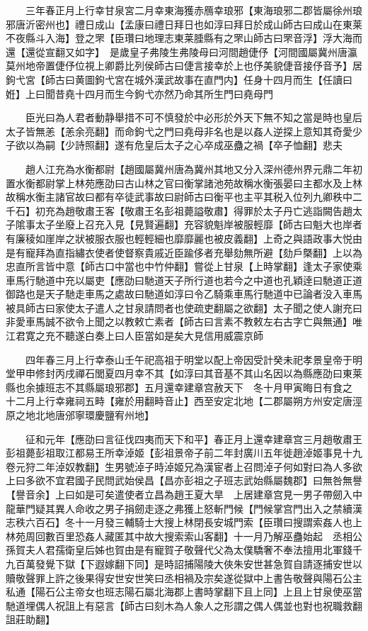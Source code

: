 　　三年春正月上行幸甘泉宮二月幸東海獲赤鴈幸琅邪【東海琅邪二郡皆屬徐州琅邪唐沂密州也】禮日成山【孟康曰禮日拜日也如淳曰拜日於成山師古曰成山在東莱不夜縣斗入海】登之罘【臣瓚曰地理志東莱腄縣有之罘山師古曰罘音浮】浮大海而還【還從宣翻又如字】　是歲皇子弗陵生弗陵母曰河間趙倢伃【河間國屬冀州唐瀛莫州地帝置倢伃位視上卿爵比列侯師古曰倢言接幸於上也伃美貌倢音接伃音予】居鉤弋宮【師古曰黄圖鉤弋宮在城外漢武故事在直門内】任身十四月而生【任讀曰姙】上曰聞昔堯十四月而生今鉤弋亦然乃命其所生門曰堯母門

　　臣光曰為人君者動静舉措不可不慎發於中必形於外天下無不知之當是時也皇后太子皆無恙【恙余亮翻】而命鉤弋之門曰堯母非名也是以姦人逆探上意知其奇愛少子欲以為嗣【少詩照翻】遂有危皇后太子之心卒成巫蠱之禍【卒子恤翻】悲夫

　　趙人江充為水衡都尉【趙國屬冀州唐為冀州其地又分入深州德州界元鼎二年初置水衡都尉掌上林苑應劭曰古山林之官曰衡掌諸池苑故稱水衡張晏曰主都水及上林故稱水衡主諸官故曰都有卒徒武事故曰尉師古曰衡平也主平其税入位列九卿秩中二千石】初充為趙敬肅王客【敬肅王名彭祖薨謚敬肅】得罪於太子丹亡逃詣闕告趙太子隂事太子坐廢上召充入見【見賢遍翻】充容貌魁岸被服輕靡【師古曰魁大也岸者有廉稜如崖岸之狀被服衣服也輕輕細也靡靡麗也被皮義翻】上奇之與語政事大悦由是有寵拜為直指繡衣使者使督察貴戚近臣踰侈者充舉劾無所避【劾戶槩翻】上以為忠直所言皆中意【師古口中當也中竹仲翻】嘗從上甘泉【上時掌翻】逢太子家使乘車馬行馳道中充以屬吏【應劭曰馳道天子所行道也若今之中道也孔穎逹曰馳道正道御路也是天子馳走車馬之處故曰馳道如淳曰令乙騎乘車馬行馳道中已論者没入車馬被具師古曰家使太子遣人之甘泉請問者也使疏吏翻屬之欲翻】太子聞之使人謝充曰非愛車馬誠不欲令上聞之以教敕亡素者【師古曰言素不教敕左右古字亡與無通】唯江君寛之充不聽遂白奏上曰人臣當如是矣大見信用威震京師

　　四年春三月上行幸泰山壬午祀高祖于明堂以配上帝因受計癸未祀孝景皇帝于明堂甲申修封丙戌禪石閭夏四月幸不其【如淳曰其音基不其山名因以為縣應劭曰東莱縣也余據班志不其縣屬琅邪郡】五月還幸建章宫赦天下　冬十月甲寅晦日有食之　十二月上行幸雍祠五畤【雍於用翻畤音止】西至安定北地【二郡屬朔方州安定唐涇原之地北地唐邠寧環慶鹽宥州地】

　　征和元年【應劭曰言征伐四夷而天下和平】春正月上還幸建章宫三月趙敬肅王彭祖薨彭祖取江都易王所幸淖姬【彭祖景帝子前二年封廣川五年徙趙淖姬事見十九卷元狩二年淖奴教翻】生男號淖子時淖姬兄為漢宦者上召問淖子何如對曰為人多欲上曰多欲不宜君國子民問武始侯昌【昌亦彭祖之子班志武始縣屬魏郡】曰無咎無譽【譽音余】上曰如是可矣遣使者立昌為趙王夏大旱　上居建章宫見一男子帶劒入中龍華門疑其異人命收之男子捐劒走逐之弗獲上怒斬門候【門候掌宫門出入之禁續漢志秩六百石】冬十一月發三輔騎士大搜上林閉長安城門索【臣瓚曰搜謂索姦人也上林苑周回數百里恐姦人藏匿其中故大搜索索山客翻】十一月乃解巫蠱始起　丞相公孫賀夫人君孺衛皇后姊也賀由是有寵賀子敬聲代父為太僕驕奢不奉法擅用北軍錢千九百萬發覺下獄【下遐嫁翻下同】是時詔捕陽陵大俠朱安世甚急賀自請逐捕安世以贖敬聲罪上許之後果得安世安世笑曰丞相禍及宗矣遂從獄中上書告敬聲與陽石公主私通【陽石公主帝女也班志陽石屬北海郡上書時掌翻下且上同】上且上甘泉使巫當馳道埋偶人祝詛上有惡言【師古曰刻木為人象人之形謂之偶人偶並也對也祝職救翻詛莊助翻】

